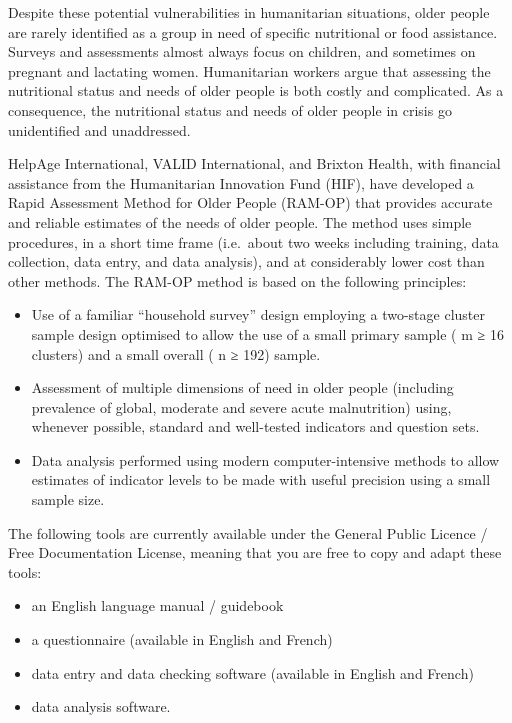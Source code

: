 \documentclass[12pt,a4paper]{book}
\theoremstyle{definition}
\theoremstyle{definition}
\theoremstyle{definition}
\theoremstyle{remark}
\begin{document}
Despite these potential vulnerabilities in humanitarian situations,
older people are rarely identified as a group in need of specific
nutritional or food assistance. Surveys and assessments almost always
focus on children, and sometimes on pregnant and lactating women.
Humanitarian workers argue that assessing the nutritional status and
needs of older people is both costly and complicated. As a consequence,
the nutritional status and needs of older people in crisis go
unidentified and unaddressed.

HelpAge International, VALID International, and Brixton Health, with
financial assistance from the Humanitarian Innovation Fund (HIF), have
developed a Rapid Assessment Method for Older People (RAM-OP) that
provides accurate and reliable estimates of the needs of older people.
The method uses simple procedures, in a short time frame (i.e.~about two
weeks including training, data collection, data entry, and data
analysis), and at considerably lower cost than other methods. The RAM-OP
method is based on the following principles:

\begin{itemize}
\item
  Use of a familiar ``household survey'' design employing a two-stage
  cluster sample design optimised to allow the use of a small primary
  sample ( m ≥ 16 clusters) and a small overall ( n ≥ 192) sample.
\item
  Assessment of multiple dimensions of need in older people (including
  prevalence of global, moderate and severe acute malnutrition) using,
  whenever possible, standard and well-tested indicators and question
  sets.
\item
  Data analysis performed using modern computer-intensive methods to
  allow estimates of indicator levels to be made with useful precision
  using a small sample size.
\end{itemize}

The following tools are currently available under the General Public
Licence / Free Documentation License, meaning that you are free to copy
and adapt these tools:

\begin{itemize}
\item
  an English language manual / guidebook
\item
  a questionnaire (available in English and French)
\item
  data entry and data checking software (available in English and
  French)
\item
  data analysis software.
\end{itemize}
\end{document}
